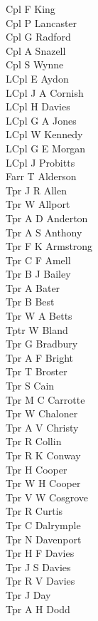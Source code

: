 \begin{multicols}{2}
  Cpl F King \\
  Cpl P Lancaster \\
  Cpl G Radford \\
  Cpl A Snazell \\
  Cpl S Wynne \\
  LCpl E Aydon \\
  LCpl J A Cornish \\
  LCpl H Davies \\
  LCpl G A Jones \\
  LCpl W Kennedy \\
  LCpl G E Morgan \\
  LCpl J Probitts \\
  Farr T Alderson \\
  Tpr J R Allen \\
  Tpr W Allport \\
  Tpr A D Anderton \\
  Tpr A S Anthony \\
  Tpr F K Armstrong \\
  Tpr C F Amell \\
  Tpr B J Bailey \\
  Tpr A Bater \\
  Tpr B Best \\
  Tpr W A Betts \\
  Tptr W Bland \\
  Tpr G Bradbury \\
  Tpr A F Bright \\
  Tpr T Broster \\
  Tpr S Cain \\
  Tpr M C Carrotte \\
  Tpr W Chaloner \\
  Tpr A V Christy \\
  Tpr R Collin \\
  Tpr R K Conway \\
  Tpr H Cooper \\
  Tpr W H Cooper \\
  Tpr V W Cosgrove \\
  Tpr R Curtis \\
  Tpr C Dalrymple \\
  Tpr N Davenport \\
  Tpr H F Davies \\
  Tpr J S Davies \\
  Tpr R V Davies \\
  Tpr J Day \\
  Tpr A H Dodd \\

\end{multicols}
